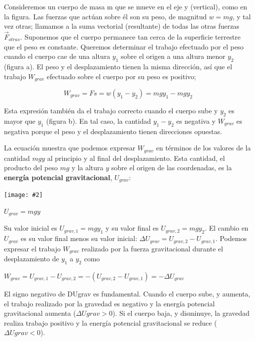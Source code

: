 \documentclass{article}
\newcommand{\bl}[1]{\textbf{#1}}
\newcommand{\definicion}[1]{%
    \vspace{0.5cm}
    \begin{definicionbox}
        #1
    \end{definicionbox}
    \vspace{0.5cm}
}
\newcommand{\ladoALado}[4]{
    \begin{minipage}[t]{#3\textwidth}
        \vspace{0pt}
        #1
    \end{minipage}
    \hfill
    \begin{minipage}[t]{#4\textwidth}
        \vspace{0pt}
        \centering
        \texttt{[image: \#2]}
    \end{minipage}
}
\begin{document}
    \ladoALado{
        \par Consideremos un cuerpo de masa m que se mueve en el eje y (vertical), como en la ﬁgura.  Las fuerzas que actúan sobre él son su peso, de magnitud $w = mg$, y tal vez otras; llamamos a la suma vectorial (resultante) de todas las otras fuerzas $\vec{F}_{otras}$. Suponemos que el cuerpo permanece tan cerca de la superﬁcie terrestre que el peso es constante. Queremos determinar el trabajo efectuado por el peso cuando el cuerpo cae de una altura $y_1$ sobre el origen a una altura menor $y_2$ (ﬁgura a). El peso y el desplazamiento tienen la misma dirección, así que el trabajo $W_{grav}$ efectuado sobre el cuerpo por su peso es positivo;

        \[ W_{grav} = F s = w (y_1 - y_2) = mg y_1 - mg y_2 \]

        \par Esta expresión también da el trabajo correcto cuando el cuerpo sube y $y_2$ es mayor que $y_1$ (ﬁgura b). En tal caso, la cantidad $y_1 - y_2$ es negativa y $W_{grav}$ es negativa porque el peso y el desplazamiento tienen direcciones opuestas.

        \par La ecuación muestra que podemos expresar $W_{grav}$ en términos de los valores de la cantidad $mg y$ al principio y al ﬁnal del desplazamiento. Esta cantidad, el producto del peso $mg$ y la altura $y$ sobre el origen de las coordenadas, es la \bl{energía potencial gravitacional}, $U_{grav}$:

    }{img/6.1-1.png}{0.6}{0.4}

    \definicion{
        \centering
        $U_{grav} = mg y$ \quad \quad \text{(energía potencial gravitacional)}
    }

    \par Su valor inicial es $U_{grav,1} = mg y_1$ y su valor ﬁnal es $U_{grav,2} = mg y_2$. El cambio en $U_{grav}$ es su valor ﬁnal menos su valor inicial: $\Delta U_{grav} = U_{grav,2} - U_{grav,1}$. Podemos expresar el trabajo $W_{grav}$ realizado por la fuerza gravitacional durante el desplazamiento de $y_1$ a $y_2$ como

    \definicion{
        \centering
        $ W_{grav} = U_{grav,1} - U_{grav,2} = -( U_{grav,2} - U_{grav,1}) = - \Delta U_{grav} $
    }

    \par El signo negativo de DUgrav es fundamental. Cuando el cuerpo sube, y aumenta, el trabajo realizado por la gravedad es negativo y la energía potencial gravitacional aumenta ($\Delta U{grav} > 0$). Si el cuerpo baja, y disminuye, la gravedad realiza trabajo positivo y la energía potencial gravitacional se reduce ($\Delta U{grav} < 0$).
\end{document}

